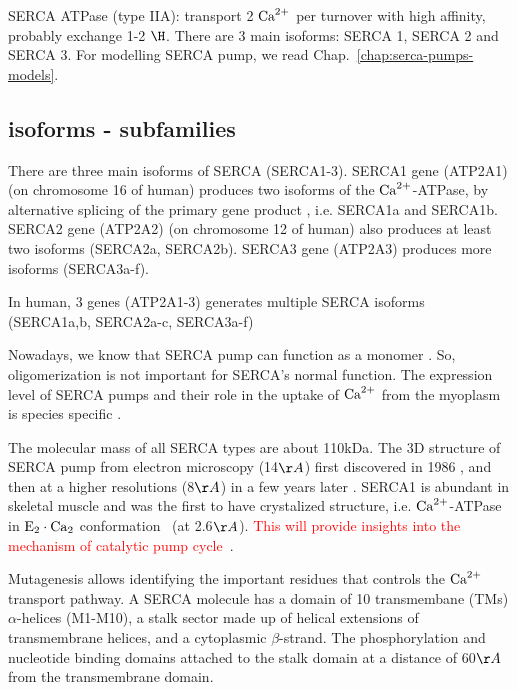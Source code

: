 SERCA ATPase (type IIA): transport 2 ${\text{Ca}^{2+}}$ per turnover with high affinity,
probably exchange 1-2 $\H$. There are 3 main isoforms: SERCA 1, SERCA 2 and
SERCA 3. For modelling SERCA pump, we read Chap.~\ref{chap:serca-pumps-models}.

  
\subsection{isoforms - subfamilies}
\label{sec:SERCA-isoforms}

There are three main isoforms of SERCA (SERCA1-3). SERCA1 gene (ATP2A1) (on
chromosome 16 of human) produces two isoforms of the ${\text{Ca}^{2+}}$-ATPase, by
alternative splicing of the primary gene product \citep{MacLennan1985,
brandl1986}, i.e. SERCA1a and SERCA1b. SERCA2 gene (ATP2A2) (on chromosome
12 of human) also produces at least two isoforms (SERCA2a, SERCA2b). SERCA3 gene
(ATP2A3) produces more isoforms (SERCA3a-f).

In human, 3 genes (ATP2A1-3) generates multiple SERCA isoforms (SERCA1a,b,
SERCA2a-c, SERCA3a-f)

Nowadays, we know that SERCA pump can function as a monomer
\citep{carafoli2000}. So, oligomerization is not important for SERCA's normal
function. The expression level of SERCA pumps and their role in the uptake of
${\text{Ca}^{2+}}$ from the myoplasm is species specific \citep{periasamy2001}. 



The molecular mass of all SERCA types are about 110kDa. The 3D structure of
SERCA pump from electron microscopy (14$\AA$) first discovered in 1986
\citep{taylor1986}, and then at a higher resolutions (8$\AA$) in a few years
later \citep{toyoshima1993,zhang1998}. 
SERCA1 is abundant in skeletal muscle and was the first to have crystalized
structure, i.e. ${\text{Ca}^{2+}}$-ATPase in $\ce{E2\cdot Ca2}$
conformation~\citep{toyoshima2000} (at 2.6$\AA$).
\textcolor{red}{This will provide insights into the mechanism of
  catalytic pump cycle}~\citep{stolkes2003}.
  
Mutagenesis allows identifying the important residues that controls the ${\text{Ca}^{2+}}$
transport pathway. A SERCA molecule has a domain of 10 transmembane (TMs)
$\alpha$-helices (M1-M10), a stalk sector made up of helical extensions of
transmembrane helices, and a cytoplasmic $\beta$-strand. The phosphorylation and
nucleotide binding domains attached to the stalk domain at a distance of 60$\AA$
from the transmembrane domain.

